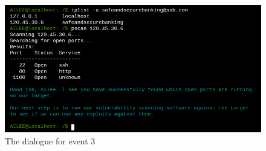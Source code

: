 \documentclass[conference]{IEEEtran}
\begin{document}
\begin{figure}[htbp]
	\centerline{\includegraphics[scale=1.36]{event3}}
	\caption{The dialogue for event 3}
	\label{fig}
\end{figure}
\end{document}
